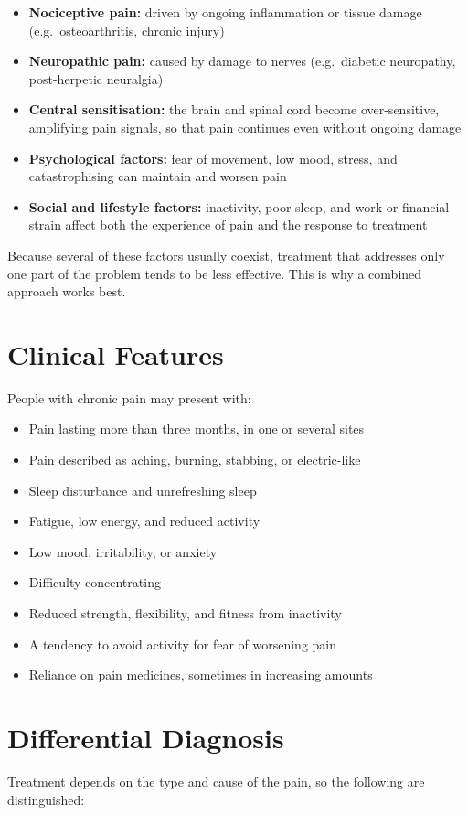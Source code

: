 \begin{itemize}
    \item \textbf{Nociceptive pain:} driven by ongoing inflammation or tissue damage (e.g.\ osteoarthritis, chronic injury)
    \item \textbf{Neuropathic pain:} caused by damage to nerves (e.g.\ diabetic neuropathy, post-herpetic neuralgia)
    \item \textbf{Central sensitisation:} the brain and spinal cord become over-sensitive, amplifying pain signals, so that pain continues even without ongoing damage
    \item \textbf{Psychological factors:} fear of movement, low mood, stress, and catastrophising can maintain and worsen pain
    \item \textbf{Social and lifestyle factors:} inactivity, poor sleep, and work or financial strain affect both the experience of pain and the response to treatment
\end{itemize}

Because several of these factors usually coexist, treatment that addresses only one part of the problem tends to be less effective. This is why a combined approach works best.

\section*{Clinical Features}
People with chronic pain may present with:

\begin{itemize}
    \item Pain lasting more than three months, in one or several sites
    \item Pain described as aching, burning, stabbing, or electric-like
    \item Sleep disturbance and unrefreshing sleep
    \item Fatigue, low energy, and reduced activity
    \item Low mood, irritability, or anxiety
    \item Difficulty concentrating
    \item Reduced strength, flexibility, and fitness from inactivity
    \item A tendency to avoid activity for fear of worsening pain
    \item Reliance on pain medicines, sometimes in increasing amounts
\end{itemize}

\section*{Differential Diagnosis}
Treatment depends on the type and cause of the pain, so the following are distinguished:

